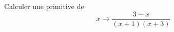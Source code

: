 Calculer une primitive de 
\begin{displaymath}
 x \rightarrow \frac{3-x}{(x+1)(x+3)}
\end{displaymath}
\bigskip \bigskip